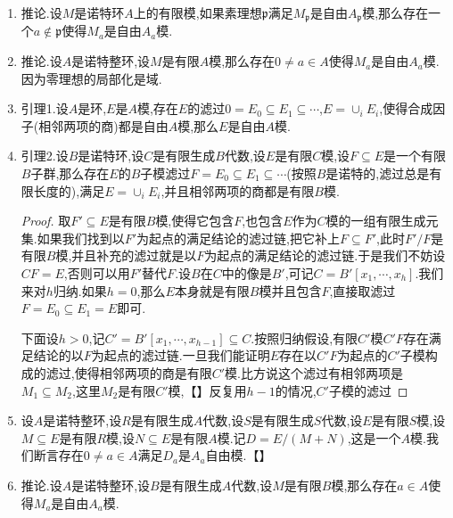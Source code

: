 \begin{enumerate}
\begin{proof}
		(b):设$M_{\mathfrak{p}}$是自由$A_{\mathfrak{p}}$模,设$\omega_1,\cdots,\omega_r$是一组基,我们可以不妨设$\omega_i\in M$.按照上一条,可取$\mathfrak{p}$的开邻域$D(a)$,使得对任意$\mathfrak{q}\in D(a)$都有$M_{\mathfrak{q}}$被$\omega_1,\cdots,\omega_r$生成.于是用$A_a$和$M_a$分别替换$A$和$M$(并且一旦证明此时$U$是开集,就有原本的$U$是开集),我们可以不妨设$\omega_1,\cdots,\omega_r\in M$能够生成任意一个$M_{\mathfrak{q}}$,其中$\mathfrak{q}$是任意素理想.也即$M/\sum A\omega_i$在任意素理想的局部化都是零,这导致它本身是零模,也即$M=\sum_iA\omega_i$.构造$A^r\to M$为$(a_1,\cdots,a_r)\mapsto\sum_ia_i\omega_i$,记核为$K$,我们有短正合列$0\to K\to A^r\to M\to0$,并且满足$K_{\mathfrak{p}}=0$.用(a)的$r=0$的情况,说明存在$\mathfrak{p}$的开邻域$V$,使得每个$\mathfrak{q}\in V$都满足$K_{\mathfrak{q}}=0$,也即$M_{\mathfrak{q}}$是自由$A_{\mathfrak{q}}$模.这说明$U$是开集.
	\end{proof}
	\item 推论.设$M$是诺特环$A$上的有限模,如果素理想$\mathfrak{p}$满足$M_{\mathfrak{p}}$是自由$A_{\mathfrak{p}}$模,那么存在一个$a\not\in\mathfrak{p}$使得$M_a$是自由$A_a$模.
	\item 推论.设$A$是诺特整环,设$M$是有限$A$模,那么存在$0\not=a\in A$使得$M_a$是自由$A_a$模.因为零理想的局部化是域.
    \item 引理1.设$A$是环,$E$是$A$模,存在$E$的滤过$0=E_0\subseteq E_1\subseteq\cdots$,$E=\cup_iE_i$,使得合成因子(相邻两项的商)都是自由$A$模,那么$E$是自由$A$模.
    \item 引理2.设$B$是诺特环,设$C$是有限生成$B$代数,设$E$是有限$C$模,设$F\subseteq E$是一个有限$B$子群,那么存在$E$的$B$子模滤过$F=E_0\subseteq E_1\subseteq\cdots$(按照$B$是诺特的,滤过总是有限长度的),满足$E=\cup_iE_i$,并且相邻两项的商都是有限$B$模.
    \begin{proof}
    	
    	取$F'\subseteq E$是有限$B$模,使得它包含$F$,也包含$E$作为$C$模的一组有限生成元集.如果我们找到以$F'$为起点的满足结论的滤过链,把它补上$F\subseteq F'$,此时$F'/F$是有限$B$模,并且补充的滤过就是以$F$为起点的满足结论的滤过链.于是我们不妨设$CF=E$,否则可以用$F'$替代$F$.设$B$在$C$中的像是$B'$,可记$C=B'[x_1,\cdots,x_h]$.我们来对$h$归纳.如果$h=0$,那么$E$本身就是有限$B$模并且包含$F$,直接取滤过$F=E_0\subseteq E_1=E$即可.
    	
    	\qquad
    	
    	下面设$h>0$,记$C'=B'[x_1,\cdots,x_{h-1}]\subseteq C$.按照归纳假设,有限$C'$模$C'F$存在满足结论的以$F$为起点的滤过链.一旦我们能证明$E$存在以$C'F$为起点的$C'$子模构成的滤过,使得相邻两项的商是有限$C'$模.比方说这个滤过有相邻两项是$M_1\subseteq M_2$,这里$M_2$是有限$C'$模,【】反复用$h-1$的情况,$C'$子模的滤过
    \end{proof}
    \item 设$A$是诺特整环,设$R$是有限生成$A$代数,设$S$是有限生成$S$代数,设$E$是有限$S$模,设$M\subseteq E$是有限$R$模,设$N\subseteq E$是有限$A$模.记$D=E/(M+N)$,这是一个$A$模.我们断言存在$0\not=a\in A$满足$D_a$是$A_a$自由模.【】
    \item 推论.设$A$是诺特整环,设$B$是有限生成$A$代数,设$M$是有限$B$模,那么存在$a\in A$使得$M_a$是自由$A_a$模.
\end{enumerate}

